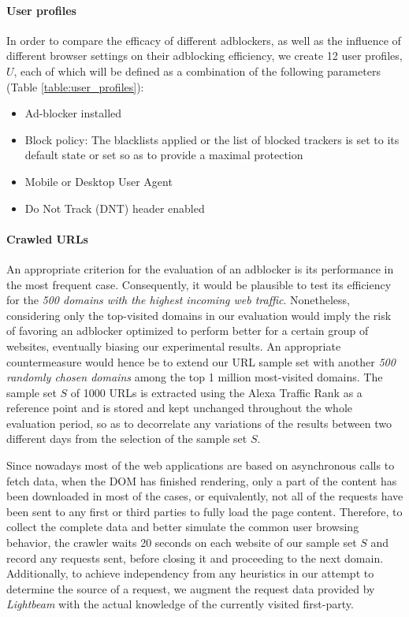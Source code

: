 \documentclass{sig-alternate}
\begin{document}
\paragraph{User profiles}
\label{sec:user_profiles}
In order to compare the efficacy of different adblockers, as well as the influence of different browser settings on their adblocking efficiency, we create 12 user profiles, $U$, each of which will be defined as a combination of the following parameters (Table \ref{table:user_profiles}):

\begin{itemize}
 \item Ad-blocker installed
 \item Block policy: The blacklists applied or the list of blocked trackers is set to its default state or set so as to provide a maximal protection
 \item Mobile or Desktop User Agent
 \item Do Not Track (DNT) header enabled
\end{itemize}


\paragraph{Crawled URLs}
\label{sec:crawled_urls}
An appropriate criterion for the evaluation of an adblocker is its performance in the most frequent case. Consequently, it would be plausible to test its efficiency for the \textit{500 domains with the highest incoming web traffic}. Nonetheless, considering only the top-visited domains in our evaluation would imply the risk of favoring an adblocker optimized to perform better for a certain group of websites, eventually biasing our experimental results. An appropriate countermeasure would hence be to extend our URL sample set with another \textit{500 randomly chosen domains} among the top 1 million most-visited domains. The sample set $S$ of 1000 URLs is extracted using the Alexa Traffic Rank as a reference point and is stored and kept unchanged throughout the whole evaluation period, so as to decorrelate any variations of the results between two different days from the selection of the sample set $S$.

Since nowadays most of the web applications are based on asynchronous calls to fetch data, when the DOM has finished rendering, only a part of the content has been downloaded in most of the cases, or equivalently, not all of the requests have been sent to any first or third parties to fully load the page content. Therefore, to collect the complete data and better simulate the common user browsing behavior, the crawler waits 20 seconds on each website of our sample set $S$ and record any requests sent, before closing it and proceeding to the next domain. Additionally, to achieve independency from any heuristics in our attempt to determine the source of a request, we augment the request data provided by \textit{Lightbeam} with the actual knowledge of the currently visited first-party.
\end{document}
